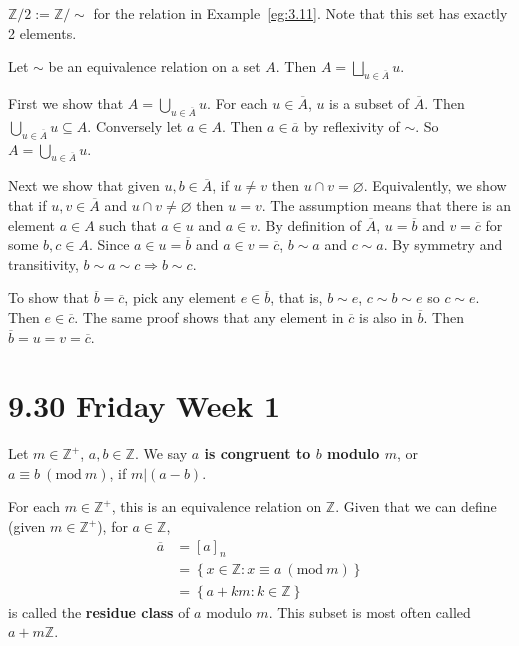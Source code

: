 \documentclass{notes}
\begin{document}
\begin{defn}
  $\mathbb Z / 2 := \mathbb Z / \sim$ for the relation in Example~\ref{eg:3.11}.
  Note that this set has exactly 2 elements.
\end{defn}

\begin{prop}
  Let $\sim$ be an equivalence relation on a set $A$.
  Then $A = \bigsqcup_{u \in \overline A} u$.
\end{prop}

\begin{prf}
  First we show that $A = \bigcup_{u \in \overline A} u$.
  For each $u \in \overline A$, $u$ is a subset of $\overline A$.
  Then $\bigcup_{u \in \overline A} u \subseteq A$.
  Conversely let $a \in A$.
  Then $a \in \overline a$ by reflexivity of $\sim$.
  So $A = \bigcup_{u \in \overline A} u$.

  Next we show that given $u, b \in \overline A$, if $u \neq v$ then $u \cap v = \varnothing$.
  Equivalently, we show that if $u, v \in \overline A$ and $u \cap v \neq \varnothing$ then $u = v$.
  The assumption means that there is an element $a \in A$ such that $a \in u$ and $a \in v$.
  By definition of $\overline A$, $u = \overline b$ and $v = \overline c$ for some $b, c \in A$.
  Since $a \in u = \overline b$ and $a \in v = \overline c$, $b \sim a$ and $c \sim a$.
  By symmetry and transitivity, $b \sim a \sim c \Rightarrow b \sim c$.
  
  To show that $\overline b = \overline c$, pick any element $e \in \overline b$, that is, $b \sim e$, $c \sim b \sim e$ so $c \sim e$.
  Then $e \in \overline c$.
  The same proof shows that any element in $\overline c$ is also in $\overline b$.
  Then $\overline b = u = v = \overline c$.
\end{prf}

\newpage

\section{9.30 Friday Week 1}

\underline{}

\begin{defn}
  Let $m \in \mathbb Z^+$, $a, b \in \mathbb Z$.
  We say {\boldmath \bfseries $a$ is congruent to $b$ modulo $m$}, or $a \equiv b\ (\mathrm{mod}\ m)$, if $m \vert (a - b)$.

  For each $m \in \mathbb Z^+$, this is an equivalence relation on $\mathbb Z$.
  Given that we can define (given $m \in \mathbb Z^+$), for $a \in \mathbb Z$, 
  \begin{align*}
    \overline a &= [a]_n \\ 
    &= \left \{ x \in \mathbb Z : x \equiv a\ (\mathrm{mod}\ m) \right \} \\ 
    &= \left \{ a + k m : k \in \mathbb Z \right \}
  \end{align*}
  is called the {\boldmath \bfseries residue class} of $a$ modulo $m$.
  This subset is most often called $a + m \mathbb Z$.
\end{defn}
\end{document}
